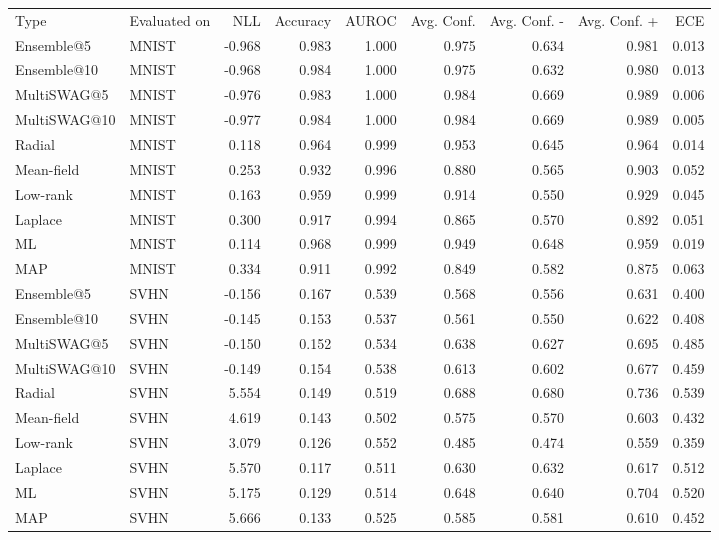 \begin{tabular}{llrrrrrrr}
Type & Evaluated on & NLL & Accuracy & AUROC & Avg. Conf. & Avg. Conf. - & Avg. Conf. + & ECE \\
Ensemble@5 & MNIST & -0.968 & 0.983 & 1.000 & 0.975 & 0.634 & 0.981 & 0.013 \\
Ensemble@10 & MNIST & -0.968 & 0.984 & 1.000 & 0.975 & 0.632 & 0.980 & 0.013 \\
MultiSWAG@5 & MNIST & -0.976 & 0.983 & 1.000 & 0.984 & 0.669 & 0.989 & 0.006 \\
MultiSWAG@10 & MNIST & -0.977 & 0.984 & 1.000 & 0.984 & 0.669 & 0.989 & 0.005 \\
Radial & MNIST & 0.118 & 0.964 & 0.999 & 0.953 & 0.645 & 0.964 & 0.014 \\
Mean-field & MNIST & 0.253 & 0.932 & 0.996 & 0.880 & 0.565 & 0.903 & 0.052 \\
Low-rank & MNIST & 0.163 & 0.959 & 0.999 & 0.914 & 0.550 & 0.929 & 0.045 \\
Laplace & MNIST & 0.300 & 0.917 & 0.994 & 0.865 & 0.570 & 0.892 & 0.051 \\
ML & MNIST & 0.114 & 0.968 & 0.999 & 0.949 & 0.648 & 0.959 & 0.019 \\
MAP & MNIST & 0.334 & 0.911 & 0.992 & 0.849 & 0.582 & 0.875 & 0.063 \\
Ensemble@5 & SVHN & -0.156 & 0.167 & 0.539 & 0.568 & 0.556 & 0.631 & 0.400 \\
Ensemble@10 & SVHN & -0.145 & 0.153 & 0.537 & 0.561 & 0.550 & 0.622 & 0.408 \\
MultiSWAG@5 & SVHN & -0.150 & 0.152 & 0.534 & 0.638 & 0.627 & 0.695 & 0.485 \\
MultiSWAG@10 & SVHN & -0.149 & 0.154 & 0.538 & 0.613 & 0.602 & 0.677 & 0.459 \\
Radial & SVHN & 5.554 & 0.149 & 0.519 & 0.688 & 0.680 & 0.736 & 0.539 \\
Mean-field & SVHN & 4.619 & 0.143 & 0.502 & 0.575 & 0.570 & 0.603 & 0.432 \\
Low-rank & SVHN & 3.079 & 0.126 & 0.552 & 0.485 & 0.474 & 0.559 & 0.359 \\
Laplace & SVHN & 5.570 & 0.117 & 0.511 & 0.630 & 0.632 & 0.617 & 0.512 \\
ML & SVHN & 5.175 & 0.129 & 0.514 & 0.648 & 0.640 & 0.704 & 0.520 \\
MAP & SVHN & 5.666 & 0.133 & 0.525 & 0.585 & 0.581 & 0.610 & 0.452 \\
\end{tabular}
